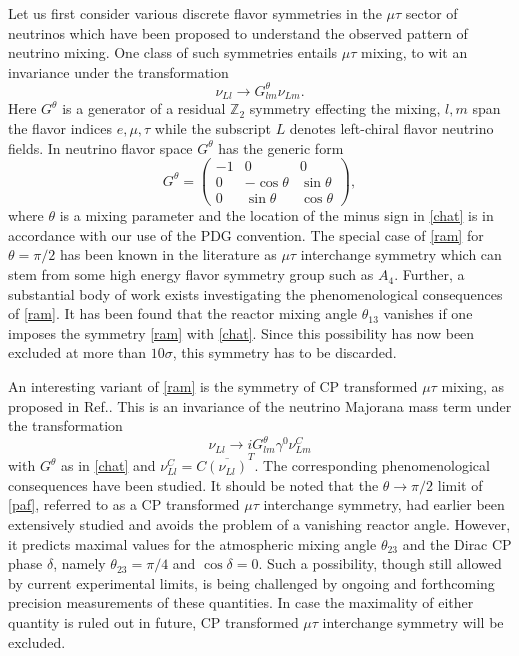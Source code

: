 \documentclass[11pt]{article}
\begin{document}
Let us first consider various discrete flavor symmetries in the $\mu\tau$ sector of neutrinos which have been proposed to understand the observed pattern of neutrino mixing. One class of such symmetries entails $\mu\tau$ mixing\cite{Samanta:2018efa}, to wit an invariance under the transformation \begin{equation}
\nu_{Ll}\to G_{lm}^\theta \nu_{L m}.\label{ram}
\end{equation} Here $G^{\theta}$ is a generator of a residual $\mathbb{Z}_2$ symmetry effecting the mixing, $l,m$ span the flavor indices $e,\mu,\tau$ while the subscript $L$ denotes left-chiral flavor neutrino fields. In neutrino flavor space $G^\theta$ has the generic form \begin{equation}G^\theta=
\begin{pmatrix}-1 & 0 & 0\\0 & -\cos\theta & \sin\theta\\
0 & \sin\theta & \cos\theta\end{pmatrix}\label{chat},
\end{equation} where $\theta$ is a mixing parameter and the location of the minus sign in \eqref{chat} is in accordance with our use of the PDG\cite{Tanabashi:2018oca} convention. The special case of \eqref{ram} for $\theta=\pi/2$ has been known in the literature as $\mu\tau$ interchange symmetry which can stem from some high energy flavor symmetry group such as $A_4$\cite{Ishimori:2010au}. Further, a substantial body of work\cite{mutaus} exists investigating the phenomenological consequences of \eqref{ram}. It has been found that the reactor mixing angle $\theta_{13}$ vanishes if one imposes the symmetry \eqref{ram} with \eqref{chat}. Since this possibility has now been excluded at more than $10\sigma$\cite{An:2015rpe}, this symmetry has to be discarded.

An interesting variant of \eqref{ram} is the symmetry of CP transformed\cite{CPt} $\mu\tau$ mixing, as proposed in Ref.\cite{Chen:2015siy}. This is an invariance of the neutrino Majorana mass term under the transformation \begin{equation}
\nu_{Ll}\to iG^\theta_{lm}\gamma^0\nu^C_{Lm}\label{paf}
\end{equation} with $G^\theta$ as in \eqref{chat} and $\nu_{Ll}^C=C\overline{(\nu_{Ll})}^T$. The corresponding phenomenological consequences have been studied\cite{Chen:2015siy}. It should be noted that the $\theta\to\pi/2$ limit of \eqref{paf}, referred to as a CP transformed $\mu\tau$ interchange symmetry, had earlier been extensively studied\cite{Grimus:2003yn} and avoids the problem of a vanishing reactor angle. However, it predicts maximal values for the atmospheric mixing angle $\theta_{23}$ and the Dirac CP phase $\delta$, namely $\theta_{23}=\pi/4$ and $\cos\delta=0$. Such a possibility, though still allowed by current experimental limits, is being challenged by ongoing and forthcoming precision measurements of these quantities. In case the maximality of either quantity is ruled out in future, CP transformed $\mu\tau$ interchange symmetry will be excluded. 
\end{document}
